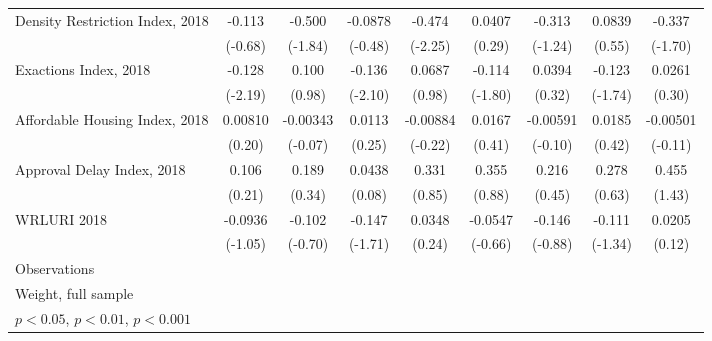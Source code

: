 \begin{table}[htbp]
\begin{tabular}{l*{8}{c}}
\addlinespace
Density Restriction Index, 2018&      -0.113         &      -0.500         &     -0.0878         &      -0.474\sym{*}  &      0.0407         &      -0.313         &      0.0839         &      -0.337         \\
                    &     (-0.68)         &     (-1.84)         &     (-0.48)         &     (-2.25)         &      (0.29)         &     (-1.24)         &      (0.55)         &     (-1.70)         \\
\addlinespace
Exactions Index, 2018&      -0.128\sym{*}  &       0.100         &      -0.136\sym{*}  &      0.0687         &      -0.114         &      0.0394         &      -0.123         &      0.0261         \\
                    &     (-2.19)         &      (0.98)         &     (-2.10)         &      (0.98)         &     (-1.80)         &      (0.32)         &     (-1.74)         &      (0.30)         \\
\addlinespace
Affordable Housing Index, 2018&     0.00810         &    -0.00343         &      0.0113         &    -0.00884         &      0.0167         &    -0.00591         &      0.0185         &    -0.00501         \\
                    &      (0.20)         &     (-0.07)         &      (0.25)         &     (-0.22)         &      (0.41)         &     (-0.10)         &      (0.42)         &     (-0.11)         \\
\addlinespace
Approval Delay Index, 2018&       0.106         &       0.189         &      0.0438         &       0.331         &       0.355         &       0.216         &       0.278         &       0.455         \\
                    &      (0.21)         &      (0.34)         &      (0.08)         &      (0.85)         &      (0.88)         &      (0.45)         &      (0.63)         &      (1.43)         \\
\addlinespace
WRLURI 2018         &     -0.0936         &      -0.102         &      -0.147         &      0.0348         &     -0.0547         &      -0.146         &      -0.111         &      0.0205         \\
                    &     (-1.05)         &     (-0.70)         &     (-1.71)         &      (0.24)         &     (-0.66)         &     (-0.88)         &     (-1.34)         &      (0.12)         \\
\midrule
Observations        &                     &                     &                     &                     &                     &                     &                     &                     \\
\bottomrule
\multicolumn{9}{l}{\footnotesize Weight, full sample}\\
\multicolumn{9}{l}{\footnotesize \sym{*} \(p<0.05\), \sym{**} \(p<0.01\), \sym{***} \(p<0.001\)}\\
\end{tabular}
\end{table}
